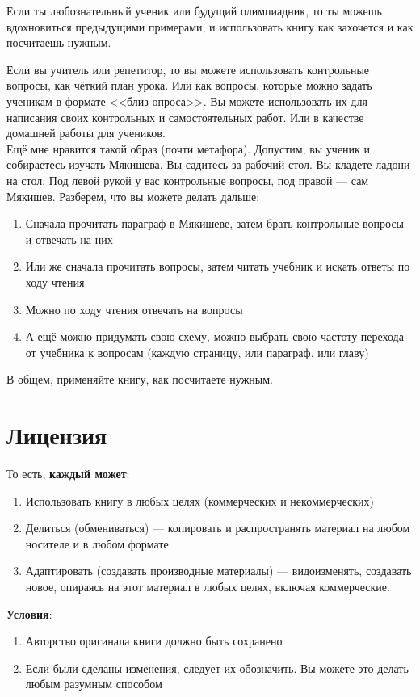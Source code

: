 \documentclass[12pt,a4paper]{report}
\begin{document}
Если ты любознательный ученик или будущий олимпиадник, то ты можешь вдохновиться предыдущими примерами, и использовать книгу как захочется и как посчитаешь нужным.

Если вы учитель или репетитор, то вы можете использовать контрольные вопросы, как чёткий план урока. Или как вопросы, которые можно задать ученикам в формате <<близ опроса>>. Вы можете использовать их для написания своих контрольных и самостоятельных работ. Или в качестве домашней работы для учеников. \\

Ещё мне нравится такой образ (почти метафора). Допустим, вы ученик и собираетесь изучать Мякишева. Вы садитесь за рабочий стол. Вы кладете ладони на стол. Под левой рукой у вас контрольные вопросы, под правой --- сам Мякишев. Разберем, что вы можете делать дальше:
\begin{enumerate}
\item Сначала прочитать параграф в Мякишеве, затем брать контрольные вопросы и отвечать на них
\item Или же сначала прочитать вопросы, затем читать учебник и искать ответы по ходу чтения
\item Можно по ходу чтения отвечать на вопросы
\item А ещё можно придумать свою схему, можно выбрать свою частоту перехода от учебника к вопросам (каждую страницу, или параграф, или главу)
\end{enumerate}

В общем, применяйте книгу, как посчитаете нужным.

\chapter*{Лицензия}
\doclicenseThis
То есть, \textbf{каждый может}:
\begin{enumerate}
\item Использовать книгу в любых целях (коммерческих и некоммерческих)
\item Делиться (обмениваться) --- копировать и распространять материал на любом носителе и в любом формате 
\item Адаптировать (создавать производные материалы) --- видоизменять, создавать новое, опираясь на этот материал в любых целях, включая коммерческие.
\end{enumerate}
\textbf{Условия}:
\begin{enumerate}
\item Авторство оригинала книги должно быть сохранено
\item Если были сделаны изменения, следует их обозначить. Вы можете это делать любым разумным способом
\end{enumerate}
\end{document}
